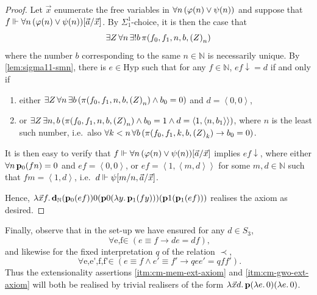\documentclass[12pt,openany]{book}
\theoremstyle{plain}
\theoremstyle{definition}
\newcommand\uplabel[1]{\textup{(#1)}}
\newcommand\tuple[1]{\left\langle #1 \right\rangle}
\newcommand\opA[1]{\mathop{\forall #1}}
\newcommand\opE[1]{\mathop{\exists #1}}
\newcommand\oplam[1]{\mathop{\lambda #1.}}
\newcommand\Hyp{\mathrm{Hyp}}
\newcommand\bp{\mathbf{p}}
\newcommand\bdN{\mathbf{d}_\mathbb{N}}
\begin{document}
\begin{proof}
  Let $\vec{x}$ enumerate the free variables in $\opA{n} \left(\varphi\mleft(n\mright) \lor \psi\mleft(n\mright)\right)$ and suppose that $f \Vdash {\opA{n} \left(\varphi\mleft(n\mright) \lor \psi\mleft(n\mright)\right)}\mleft[\vec{a}/\vec{x}\mright]$. By $\Sigma^1_1$-choice, it is then the case that
  \[\opE{Z} \opA{n} \opE{!b} \pi\mleft(f_0, f_1, n, b, \left(Z\right)_n\mright)\]
  where the number $b$ corresponding to the same $n \in \mathbb{N}$ is necessarily unique. By \autoref{lem:sigma11-smn}, there is $e \in \Hyp$ such that for any $f \in \mathbb{N}$, $ef {\downarrow} = d$ if and only if
  \begin{enumerate}[label=\uplabel{\alph*}]
    \item either $\opE{Z} \opA{n} \opE{b} \left(\pi\mleft(f_0, f_1, n, b, \left(Z\right)_n\mright) \land b_0 = 0\right)$ and $d = \tuple{0, 0}$,
    \item or $\opE{Z} \opE{n, b} \left(\pi\mleft(f_0, f_1, n, b, \left(Z\right)_n\mright) \land b_0 = 1 \land d = \tuple{1, \tuple{n, b_1}}\right)$, where $n$ is the least such number, i.e.\ also $\opA{k < n} \opA{b} \left(\pi\mleft(f_0, f_1, k, b, \left(Z\right)_k\mright) \rightarrow b_0 = 0\right)$.
  \end{enumerate}
  It is then easy to verify that $f \Vdash {\opA{n} \left(\varphi\mleft(n\mright) \lor \psi\mleft(n\mright)\right)}\mleft[\vec{a}/\vec{x}\mright]$ implies $ef {\downarrow}$, where either $\opA{n} \bp_0 \mleft(fn\mright) = 0$ and $ef = \tuple{0, 0}$, or $ef = \tuple{1, \tuple{m, d}}$ for some $m, d \in \mathbb{N}$ such that $fm = \tuple{1, d}$, i.e.\ $d \Vdash \psi\mleft[m/n, \vec{a}/\vec{x}\mright]$.

  Hence, $\oplam{\vec{x} f} \bdN \mleft(\bp_0 \mleft(ef\mright)\mright) 0 \mleft(\bp 0 \mleft(\oplam{y} \bp_1 \mleft(fy\mright)\mright)\mright) \mleft(\bp 1 \mleft(\bp_1 \mleft(ef\mright)\mright)\mright)$ realises the axiom as desired.
\end{proof}

Finally, observe that in the set-up we have ensured for any $d \in S_3$,
\[\opA{e, f \in S_2} \left(e \equiv f \rightarrow de = df\right),\]
and likewise for the fixed interpretation $q$ of the relation $\prec$,
\[\opA{e, e', f, f' \in S_2} \left(e \equiv f \land e' \equiv f' \rightarrow qe e' = qf f'\right).\]
Thus the extensionality assertions \ref{itm:cm-mem-ext-axiom} and \ref{itm:cm-gwo-ext-axiom} will both be realised by trivial realisers of the form $\oplam{\vec{x} d} \bp \mleft(\oplam{e} 0\mright) \mleft(\oplam{e} 0\mright)$.
\end{document}

